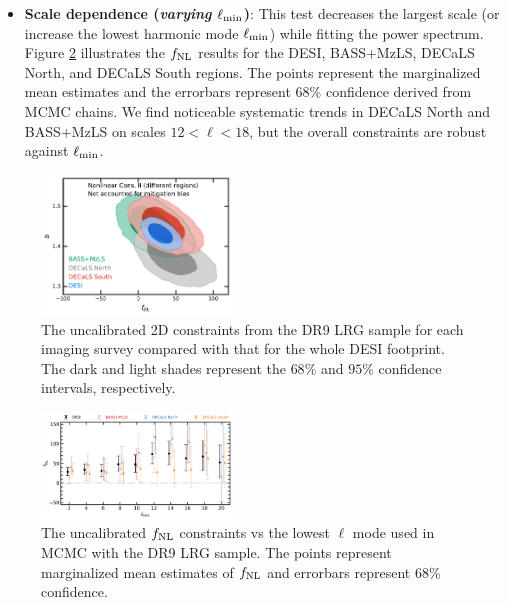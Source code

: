 \begin{itemize}
\item \textbf{Scale dependence (\textit{varying $\ell_{\rm min}$})}: This test decreases the largest scale (or increase the lowest harmonic mode $\ell_{\rm min}$) while fitting the power spectrum. Figure \ref{fig:mcmc_dr9elmin} illustrates the $f_{\rm NL}$ results for the DESI, BASS+MzLS, DECaLS North, and DECaLS South regions. The points represent the marginalized mean estimates and the errorbars represent $68$\% confidence derived from MCMC chains. We find noticeable systematic trends in DECaLS North and BASS+MzLS on scales $12<\ell<18$, but the overall constraints are robust against $\ell_{\rm min}$.

\end{itemize}

\begin{figure}
    \centering
    \includegraphics[width=0.45\textwidth]{figures/mcmc_dr9regions.pdf} 
    \caption{The uncalibrated 2D constraints from the DR9 LRG sample for each imaging survey compared with that for the whole DESI footprint. The dark and light shades represent the $68\%$ and $95\%$ confidence intervals, respectively.}\label{fig:mcmc_dr9reg}
\end{figure}


\begin{figure}
    \centering
    \includegraphics[width=0.45\textwidth]{figures/fnl_elmin.pdf}     
    \caption{The uncalibrated $f_{\rm NL}$ constraints vs the lowest $\ell$ mode used in MCMC with the DR9 LRG sample. The points represent marginalized mean estimates of $f_{\rm NL}$ and errorbars represent $68$\% confidence.}\label{fig:mcmc_dr9elmin}
\end{figure}


